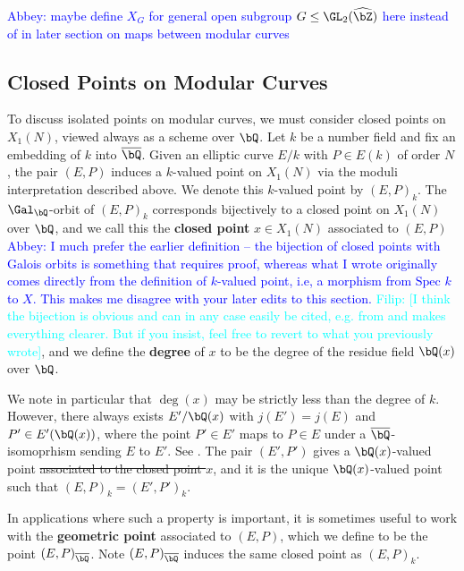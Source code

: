 \documentclass[11pt,reqno]{amsart}
\theoremstyle{plain}
\theoremstyle{definition}
\newcommand{\Q}{\bQ}
\newcommand{\Z}{\bZ}
\newcommand{\filip}[1]{{\textcolor{cyan}{Filip: [#1]}}}
\newcommand{\abbey}[1]{\textcolor{blue}{Abbey: #1}}
\newcommand{\abedit}[1]{{\color{blue} #1}}
\newcommand{\fedit}[1]{{\color{cyan} #1}}
\begin{document}
\abbey{maybe define $X_G$ for general open subgroup $G \leq \GL_2(\widehat{\Z})$ here instead of in later section on maps between modular curves}

\subsection{Closed Points on Modular Curves} To discuss isolated points on modular curves, we must consider closed points on $X_1(N)$, viewed always as a scheme over $\Q$. \fedit{Let $k$ be a number field and fix an embedding of $k$ into $\overline \Q$}.
Given an elliptic curve $E/k$ with $P \in E(k)$ of order $N$, the pair $(E,P)$ induces a $k$-valued point on $X_1(N)$ via the moduli interpretation described above. We denote this $k$-valued point by $(E,P)_k$. %
\fedit{The $\Gal_\Q$-orbit of $(E,P)_k$ corresponds bijectively to a closed point on $X_1(N)$ over $\Q$, and we call this the \textbf{closed point} $x \in X_1(N)$} associated to $(E,P)$ \abbey{I much prefer the earlier definition -- the bijection of closed points with Galois orbits is something that requires proof, whereas what I wrote originally comes directly from the definition of $k$-valued point, i.e, a morphism from $\text{Spec }k$ to $X$. This makes me disagree with your later edits to this section.} \filip{I think the bijection is obvious and can in any case easily be cited, e.g. from \cite[Proposition 2.4.6]{Poonen_RPV} and makes everything clearer. But if you insist, feel free to revert to what you previously wrote},  and we define the \textbf{degree} of $x$ to be the degree of the residue field $\Q(x)$ over $\Q$.

We note in particular that $\deg(x)$ may be strictly less than the degree of $k$. However, there always exists $E'/\Q(x)$ with $j(E')=j(E)$ and $P' \in E'(\Q(x))$, where the point $P' \in E'$ maps to $P \in E$ under a $\overline \Q$-isomoprhism sending $E$ to $E'$. See \cite[p. 274, Proposition VI.3.2]{DR}. \fedit{The pair $(E',P')$ gives a $\Q(x)$-valued point \st{associated to the closed point $x$}, and it is the unique $\Q(x)$-valued point such that $(E,P)_{k}=(E',P')_{k}.$}

In applications where such a property is important, it is sometimes useful to work with the \textbf{geometric point} associated to $(E,P)$, which we define to be the point $(E,P)_{\overline{\Q}}$. Note $(E,P)_{\overline{\Q}}$ induces the same closed point as $(E,P)_k$. 
\end{document}
